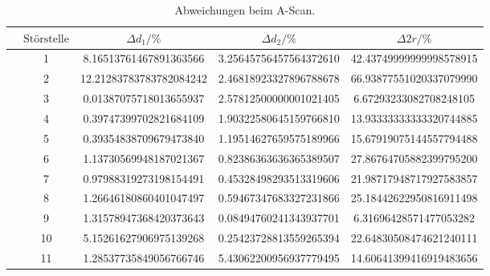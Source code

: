 \begin{table}
        \caption{Abweichungen beim A-Scan.}
        \centering
        \label{tab:diska}
        \begin{tabular}{l@{}S[round-mode=off, table-format=2.0]S[table-format=2.3, round-precision=2, round-mode=places] S[table-format=1.3, round-precision=2, round-mode=places] S[table-format=2.1, round-precision=2, round-mode=places] } \toprule & {$\text{Störstelle}$}& {$\Delta d_1/\si{\percent}$}& {$\Delta d_2/\si{\percent}$}& {$\Delta 2r/\si{\percent}$}\\\midrule& 1 & 8.16513761467891363566 & 3.25645756457564372610 & 42.43749999999998578915 \\
& 2 & 12.21283783783782084242 & 2.46818923327896788678 & 66.93877551020337079990 \\
& 3 & 0.01387075718013655937 & 2.57812500000001021405 & 6.67293233082708248105 \\
& 4 & 0.39747399702821684109 & 1.90322580645159766810 & 13.93333333333320744885 \\
& 5 & 0.39354838709679473840 & 1.19514627659575189966 & 15.67919075144557794488 \\
& 6 & 1.13730569948187021367 & 0.82386363636365389507 & 27.86764705882399795200 \\
& 7 & 0.97988319273198154491 & 0.45328498293513319606 & 21.98717948717927583857 \\
& 8 & 1.26646180860401047497 & 0.59467347683327231866 & 25.18442622950816911498 \\
& 9 & 1.31578947368420373643 & 0.08494760241343937701 & 6.31696428571477053282 \\
& 10 & 5.15261627906975139268 & 0.25423728813559265394 & 22.64830508474621240111 \\
& 11 & 1.28537735849056766746 & 5.43062200956937779495 & 14.60641399416919483656 \\
 \bottomrule \end{tabular} \end{table}
